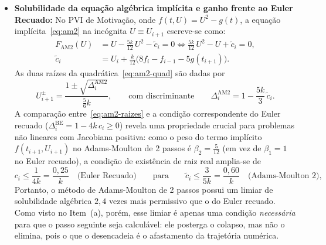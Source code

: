 \documentclass[12pt, a4paper]{article}
\begin{document}
\begin{itemize}
    $\mathcal{S}_{\text{AM2}} = \{z \in \mathbb{C} : |\zeta_1(z)| \le 1 \text{ e } |\zeta_2(z)| \le 1\}$ deixa de ser
    ilimitada em $\mathbb{C}^-$ e passa a ser um domínio fechado contido no semiplano esquerdo. Para determinar seu
    intervalo de estabilidade no semieixo real negativo ($z \le 0$), observa-se que em $\zeta = 1$ tem-se
    $\pi(1; z) = -z = 0 \implies z = 0$, e na fronteira oposta do círculo unitário ($\zeta = -1$) tem-se
    \[
      \pi(-1; z) = \left(1 - \frac{5}{12}z\right) + \left(1 + \frac{8}{12}z\right) + \frac{1}{12}z = 2 + \frac{1}{3}z = 0
      \quad\Longrightarrow\quad z = -6.
    \]
    Assim, o intervalo de estabilidade real do Adams-Moulton de 2 passos é $[-6,\, 0]$, mais que o dobro do intervalo do
    RK4 ($[-2{,}785,\, 0]$) e o triplo do Euler avançado ($[-2,\, 0]$), embora menor que o semieixo $(-\infty, 0]$ do
    Euler recuado.
  \item \textbf{Solubilidade da equação algébrica implícita e ganho frente ao Euler Recuado:} No PVI de Motivação, onde
    $f(t, U) = U^2 - g(t)$, a equação implícita~\eqref{eq:am2} na incógnita $U \equiv U_{i+1}$ escreve-se como:
    \begin{equation}\label{eq:am2-quad}
    \begin{split}
    F_{\text{AM2}}(U) &= U - \frac{5k}{12}\,U^2 - \tilde{c}_i = 0 \iff \frac{5k}{12}\,U^2 - U + \tilde{c}_i = 0, \\
    \tilde{c}_i &= U_i + \frac{k}{12}\bigl(8f_i - f_{i-1} - 5g(t_{i+1})\bigr).
    \end{split}
    \end{equation}
    As duas raízes da quadrática~\eqref{eq:am2-quad} são dadas por
    \begin{equation}\label{eq:am2-raizes}
      U_{i+1}^{\pm} = \frac{1 \pm \sqrt{\Delta_i^{\text{AM2}}}}{\frac{5}{6}k},
      \qquad \text{com discriminante} \qquad
      \Delta_i^{\text{AM2}} = 1 - \frac{5k}{3}\,\tilde{c}_i.
    \end{equation}
    A comparação entre~\eqref{eq:am2-raizes} e a condição correspondente do Euler recuado ($\Delta_i^{\text{BE}} = 1 - 4k\,c_i \ge 0$)
    revela uma propriedade crucial para problemas não lineares com Jacobiana positiva: como o peso do termo implícito
    $f(t_{i+1}, U_{i+1})$ no Adams-Moulton de 2 passos é $\beta_2 = \frac{5}{12}$ (em vez de $\beta_1 = 1$ no Euler
    recuado), a condição de existência de raiz real amplia-se de
    \begin{equation}\label{eq:solubilidade-am2-vs-be}
      c_i \le \frac{1}{4k} = \frac{0{,}25}{k} \quad\text{(Euler Recuado)}
      \qquad\text{para}\qquad
      \tilde{c}_i \le \frac{3}{5k} = \frac{0{,}60}{k} \quad\text{(Adams-Moulton 2)},
    \end{equation}
    Portanto, o método de Adams-Moulton de 2 passos possui um limiar de solubilidade algébrica $2{,}4$ vezes mais permissivo que o do Euler recuado. Como visto no Item~(a), porém, esse limiar é apenas uma condição \emph{necessária} para que o passo seguinte seja calculável: ele posterga o colapso, mas não o elimina, pois o que o desencadeia é o afastamento da trajetória numérica.
\end{itemize}
\end{document}
